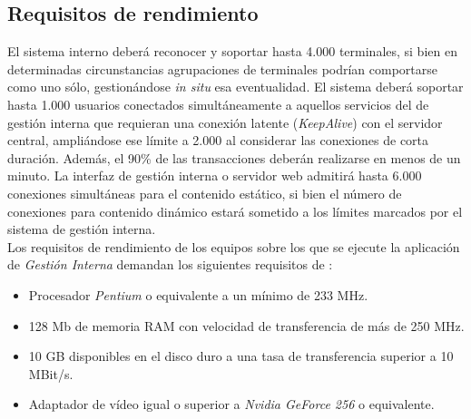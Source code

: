 \documentclass[11pt, a4paper, twoside, titlepage]{article}
\begin{document}
				

				

				
						
				

				

		\stopcontents[tocfunciones]

		\subsection{Requisitos de rendimiento}
			El sistema interno deberá reconocer y soportar hasta 4.000 terminales, si bien en determinadas circunstancias agrupaciones de terminales podrían comportarse como uno sólo, gestionándose \textit{in situ} esa eventualidad. El sistema deberá soportar hasta 1.000 usuarios conectados simultáneamente a aquellos servicios del \software de gestión interna que requieran una conexión latente (\textit{KeepAlive}) con el servidor central, ampliándose ese límite a 2.000 al considerar las conexiones de corta duración. Además, el 90\% de las transacciones deberán realizarse en menos de un minuto. La interfaz de gestión interna o servidor web admitirá hasta 6.000 conexiones simultáneas para el contenido estático, si bien el número de conexiones para contenido dinámico estará sometido a los límites marcados por el sistema de gestión interna.\\

			Los requisitos de rendimiento de los equipos sobre los que se ejecute la aplicación de \textit{Gestión Interna} demandan los siguientes requisitos de \hardware{}:
				\begin{itemize}
					\item Procesador \textit{Pentium} o equivalente a un mínimo de 233 MHz.
					\item 128 Mb de memoria RAM con velocidad de transferencia de más de 250 MHz.
					\item 10 GB disponibles en el disco duro a una tasa de transferencia superior a 10 MBit/s.
					\item Adaptador de vídeo igual o superior a \textit{Nvidia GeForce 256} o equivalente.
				\end{itemize}
\end{document}
